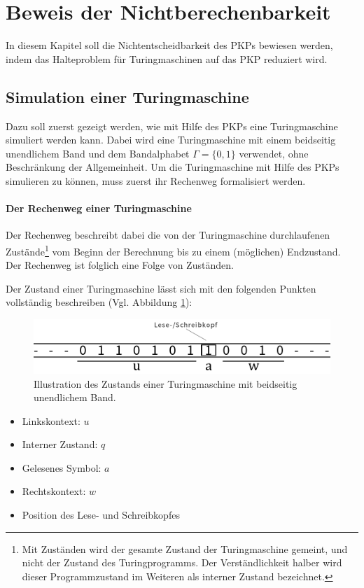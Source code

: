\documentclass[]{scrartcl}
\begin{document}
\section{Beweis der Nichtberechenbarkeit}
	In diesem Kapitel soll die Nichtentscheidbarkeit des PKPs bewiesen werden, indem das Halteproblem für Turingmaschinen auf das PKP reduziert wird.

	\subsection{Simulation einer Turingmaschine}
		Dazu soll zuerst gezeigt werden, wie mit Hilfe des PKPs eine Turingmaschine simuliert werden kann. Dabei wird eine Turingmaschine mit einem beidseitig unendlichem Band und dem Bandalphabet $\varGamma = \{0,1\}$ verwendet, ohne Beschränkung der Allgemeinheit. Um die Turingmaschine mit Hilfe des PKPs simulieren zu können, muss zuerst ihr Rechenweg formalisiert werden. 
		
		
		\paragraph{Der Rechenweg einer Turingmaschine}
			Der Rechenweg beschreibt dabei die von der Turingmaschine durchlaufenen Zustände\footnote{Mit Zuständen wird der gesamte Zustand der Turingmaschine gemeint, und nicht der Zustand des Turingprogramms. Der Verständlichkeit halber wird dieser Programmzustand im Weiteren als interner Zustand bezeichnet.} vom Beginn der Berechnung bis zu einem (möglichen) Endzustand. Der Rechenweg ist folglich eine Folge von Zuständen.
			
			Der Zustand einer Turingmaschine lässt sich mit den folgenden Punkten vollständig beschreiben (Vgl. Abbildung \ref{img-turingsnapshot}):
			\begin{figure}
				\centering
				\includegraphics[width=0.85\linewidth]{../abbildungen/turing-snapshot}
				\caption{Illustration des Zustands einer Turingmaschine mit beidseitig unendlichem Band.}
				\label{img-turingsnapshot}
			\end{figure}
			
			\begin{itemize}
				\item Linkskontext: $u$
				\item Interner Zustand: $q$
				\item Gelesenes Symbol: $a$
				\item Rechtskontext: $w$
				\item Position des Lese- und Schreibkopfes
			\end{itemize}
			
\end{document}

